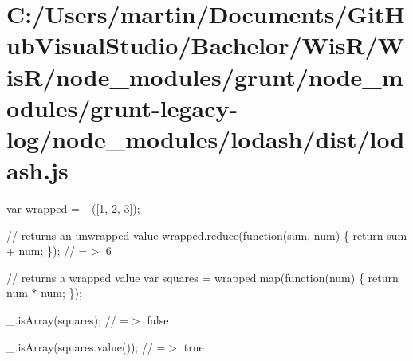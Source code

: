 \hypertarget{_c_1_2_users_2martin_2_documents_2_git_hub_visual_studio_2_bachelor_2_wis_r_2_wis_r_2node_module1901735849ae17364bea5e0c2676d264}{}\section{C\+:/\+Users/martin/\+Documents/\+Git\+Hub\+Visual\+Studio/\+Bachelor/\+Wis\+R/\+Wis\+R/node\+\_\+modules/grunt/node\+\_\+modules/grunt-\/legacy-\/log/node\+\_\+modules/lodash/dist/lodash.\+js}
var wrapped = \+\_\+(\mbox{[}1, 2, 3\mbox{]});

// returns an unwrapped value wrapped.\+reduce(function(sum, num) \{ return sum + num; \}); // =$>$ 6

// returns a wrapped value var squares = wrapped.\+map(function(num) \{ return num $\ast$ num; \});

\+\_\+.\+is\+Array(squares); // =$>$ false

\+\_\+.\+is\+Array(squares.\+value()); // =$>$ true


